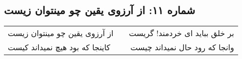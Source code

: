 \begin{center}
\section*{شماره ۱۱: از آرزوی یقین چو مینتوان زیست}
\label{sec:011}
\begin{longtable}{l p{0.5cm} r}
از آرزوی یقین چو مینتوان زیست
&&
بر خلق بباید ای خردمند! گریست
\\
کاینجا که بود هیچ نمیداند کیست
&&
وانجا که رود حال نمیداند چیست
\\
\end{longtable}
\end{center}
